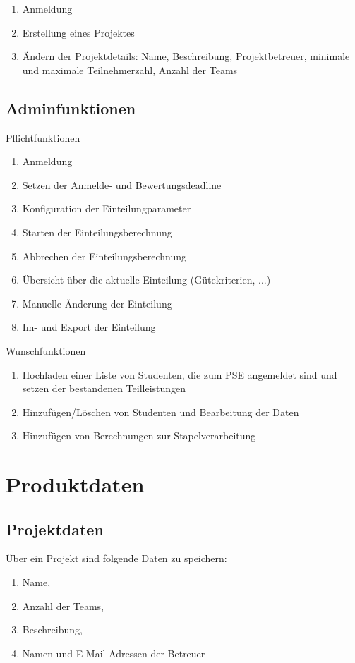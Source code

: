\documentclass[parskip=full]{scrartcl}
\newcommand{\swtLabel}[1]{\textbf{\textbackslash #1\arabic*0\textbackslash}}
\begin{document}
\begin{enumerate}[label=\swtLabel{FA}, resume]
  \item Anmeldung
  \item Erstellung eines Projektes
  \item Ändern der Projektdetails: Name, Beschreibung, Projektbetreuer, minimale und maximale Teilnehmerzahl, Anzahl der Teams
\end{enumerate}

\subsection{Adminfunktionen}

Pflichtfunktionen

\begin{enumerate}[label=\swtLabel{FA}, resume]
  \item Anmeldung
  \item Setzen der Anmelde- und Bewertungsdeadline
  \item Konfiguration der Einteilungparameter
  \item Starten der Einteilungsberechnung
  \item Abbrechen der Einteilungsberechnung
  \item Übersicht über die aktuelle Einteilung (Gütekriterien, ...)
  \item Manuelle Änderung der Einteilung
  \item Im- und Export der Einteilung
\end{enumerate}

Wunschfunktionen

\begin{enumerate}[label=\swtLabel{FA}, resume]
  \item Hochladen einer Liste von Studenten, die zum PSE angemeldet sind und setzen der bestandenen Teilleistungen
  \item Hinzufügen/Löschen von Studenten und Bearbeitung der Daten
  \item Hinzufügen von Berechnungen zur Stapelverarbeitung
\end{enumerate}

\section{Produktdaten}

\subsection{Projektdaten} 
Über ein Projekt sind folgende Daten zu speichern:
\begin{enumerate}[label=\swtLabel{D}] 
  \item Name,
  \item Anzahl der Teams,
  \item Beschreibung,
  \item Namen und E-Mail Adressen der Betreuer
\end{enumerate}
\end{document}
